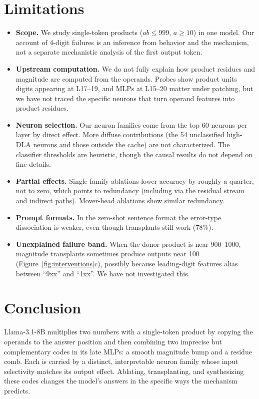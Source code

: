 \documentclass[11pt]{article}
\begin{document}
\section{Limitations}
\begin{itemize}[leftmargin=1.2em,itemsep=1pt]
  \item \textbf{Scope.} We study single-token products ($ab\le999$, $a\ge10$) in one model. Our account of 4-digit failures is an inference from behavior and the mechanism, not a separate mechanistic analysis of the first output token.
  \item \textbf{Upstream computation.} We do not fully explain how product residues and magnitude are computed from the operands. Probes show product units digits appearing at L17--19, and MLPs at L15--20 matter under patching, but we have not traced the specific neurons that turn operand features into product residues.
  \item \textbf{Neuron selection.} Our neuron families come from the top 60 neurons per layer by direct effect. More diffuse contributions (the 54 unclassified high-DLA neurons and those outside the cache) are not characterized. The classifier thresholds are heuristic, though the causal results do not depend on fine details.
  \item \textbf{Partial effects.} Single-family ablations lower accuracy by roughly a quarter, not to zero, which points to redundancy (including via the residual stream and indirect paths). Mover-head ablations show similar redundancy.
  \item \textbf{Prompt formats.} In the zero-shot sentence format the error-type dissociation is weaker, even though transplants still work (78\%).
  \item \textbf{Unexplained failure band.} When the donor product is near 900--1000, magnitude transplants sometimes produce outputs near 100 (Figure~\ref{fig:interventions}c), possibly because leading-digit features alias between ``9xx'' and ``1xx''. We have not investigated this.
\end{itemize}

\section{Conclusion}
Llama-3.1-8B multiplies two numbers with a single-token product by copying the operands to the answer position and then combining two imprecise but complementary codes in its late MLPs: a smooth magnitude bump and a residue comb. Each is carried by a distinct, interpretable neuron family whose input selectivity matches its output effect. Ablating, transplanting, and synthesizing these codes changes the model's answers in the specific ways the mechanism predicts.
\end{document}

